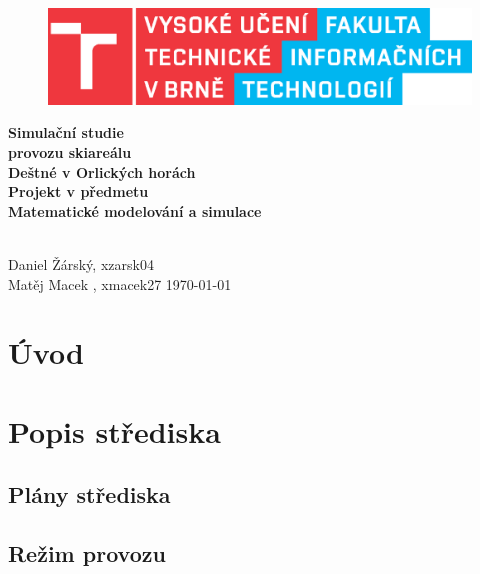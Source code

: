 \documentclass[a4paper, 11pt]{article}\usepackage{times}
\begin{document}
\begin{titlepage}
    \begin{center}
    \begin{figure}[!h]
            \centering
            \includegraphics[scale=0.7]{logo.eps}
        \end{figure}

        \vspace{100px}

        \huge{
            \textbf{
                Simulační studie\\ provozu skiareálu \\
                Deštné v Orlických horách\\
            }
        }
        \vspace{40px}
        \large
        \textbf{
            Projekt v předmetu\\
            Matematické modelování a simulace\\
        }
        \vfill
    \end{center}
        \Large{
            \hfill\\
            Daniel Žárský, xzarsk04\\
            Matěj Macek , xmacek27 \hfill \today
        }

\end{titlepage}


\clearpage
\thispagestyle{empty}
	\tableofcontents
\newpage
{}
\setcounter{page}{1}
\section{Úvod} %
\section{Popis střediska}
\subsection{Plány střediska}
\subsection{Režim provozu}
\end{document}
